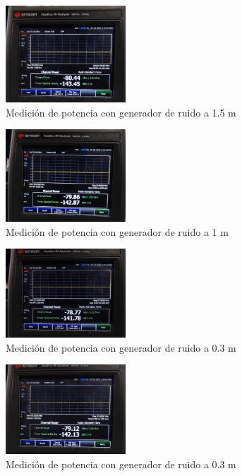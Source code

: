 \documentclass[conference]{IEEEtran}
\begin{document}
	\begin{figure}[h]
		\centering
		\includegraphics[width=0.4\textwidth]{media/M-Ruido1.5.jpg}
		\caption{Medición de potencia con generador de ruido a 1.5 m}
		\label{fig:M-Ruido1.5}
	\end{figure}
	
	\begin{figure}[h]
		\centering
		\includegraphics[width=0.4\textwidth]{media/M-Ruido1.jpg}
		\caption{Medición de potencia con generador de ruido a 1 m}
		\label{fig:M-Ruido1}
	\end{figure}
	
	\begin{figure}[h]
		\centering
		\includegraphics[width=0.4\textwidth]{media/M-Ruido0.5.jpg}
		\caption{Medición de potencia con generador de ruido a 0.3 m}
		\label{fig:M-Ruido0.5}
	\end{figure}
	
	\begin{figure}[h]
		\centering
		\includegraphics[width=0.4\textwidth]{media/M-Ruido0.3.jpg}
		\caption{Medición de potencia con generador de ruido a 0.3 m}
		\label{fig:M-Ruido0.3}
	\end{figure}
	
\end{document}

